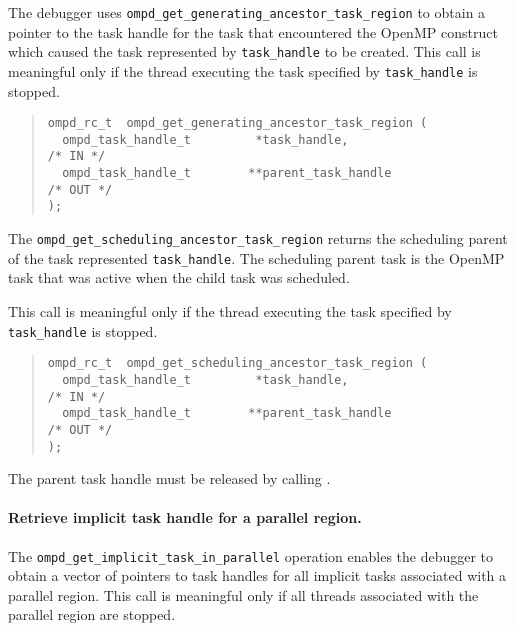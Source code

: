 The  debugger uses \verb|ompd_get_generating_ancestor_task_region| to obtain
a pointer to the task handle for the task that encountered the OpenMP
construct which caused the task represented by \verb|task_handle|
to be created.
This call is meaningful only if the thread executing the task specified by
\verb|task_handle|  is stopped.
\begin{quote}
\begin{lstlisting}
ompd_rc_t  ompd_get_generating_ancestor_task_region (
  ompd_task_handle_t         *task_handle,                          /* IN */
  ompd_task_handle_t        **parent_task_handle                   /* OUT */
);
\end{lstlisting}
\end{quote}

The \verb|ompd_get_scheduling_ancestor_task_region| returns the
scheduling parent of the task represented \verb|task_handle|.
The scheduling parent task is the OpenMP task that was active when
the child task was scheduled.

This call is meaningful only if the thread executing the task specified by
\verb|task_handle|  is stopped.
\begin{quote}
\begin{lstlisting}
ompd_rc_t  ompd_get_scheduling_ancestor_task_region (
  ompd_task_handle_t         *task_handle,                          /* IN */
  ompd_task_handle_t        **parent_task_handle                   /* OUT */
);
\end{lstlisting}
\end{quote}

The parent task handle must be released by calling
.
 
\paragraph{Retrieve implicit task handle for a parallel region.}
The   \verb|ompd_get_implicit_task_in_parallel|  operation enables
the debugger to obtain a vector of pointers to task handles for all
implicit tasks associated with a parallel region.
This call is meaningful only if all threads associated
with the parallel region are stopped.

